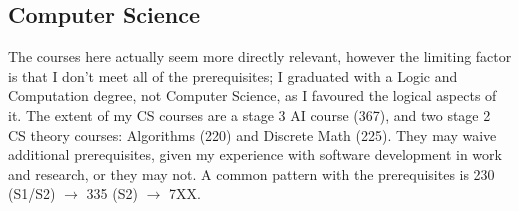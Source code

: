 \documentclass[10pt,a4paper]{article}
\begin{document}
\subsection{Computer Science}
\label{sec:computer-science}

The courses here actually seem more directly relevant, however the
limiting factor is that I don't meet all of the prerequisites; I
graduated with a Logic and Computation degree, not Computer Science,
as I favoured the logical aspects of it. The extent of my CS courses
are a stage 3 AI course (367), and two stage 2 CS theory courses:
Algorithms (220) and Discrete Math (225). They may waive additional
prerequisites, given my experience with software development in work
and research, or they may not. A common pattern with the prerequisites
is 230 (S1/S2) \(\to\) 335 (S2) \(\to\) 7XX.
\end{document}
